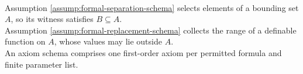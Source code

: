 \begin{perspective} \label{per:separation-versus-replacement} \\
Assumption \ref{assump:formal-separation-schema} selects elements of a bounding set $A$, so its witness satisfies $B\subseteq A$.\\
Assumption \ref{assump:formal-replacement-schema} collects the range of a definable function on $A$, whose values may lie outside $A$.\\
An axiom schema comprises one first-order axiom per permitted formula and finite parameter list.
\end{perspective}

